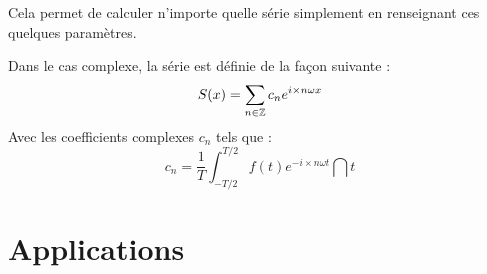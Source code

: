 	Cela permet de calculer n'importe quelle série simplement en renseignant ces quelques paramètres.

	\bigskip

		Dans le cas complexe, la série est définie de la façon suivante :
		\begin{equation}
			S(x) = \sum_{n \in \mathbb{Z}} c_n e^{i \times n \omega x}
		\end{equation}
		Avec les coefficients complexes $c_n$ tels que :
		\begin{equation}
			c_n = \frac{1}{T} \int_{-T/2}^{T/2} f(t) e^{-i \times n \omega t} \dint{t}
		\end{equation}


		



\section{Applications}


